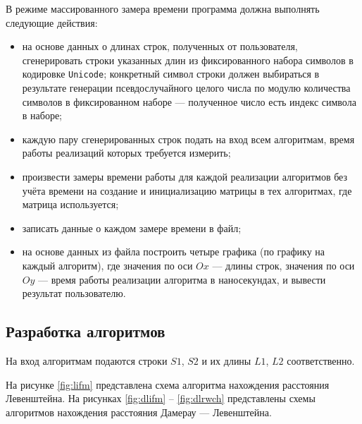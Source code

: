 В режиме массированного замера времени программа должна выполнять следующие действия:
\begin{itemize}
    \item на основе данных о длинах строк, полученных от пользователя, сгенерировать строки указанных длин из фиксированного набора символов в кодировке \texttt{Unicode}; конкретный символ строки должен выбираться в результате генерации псевдослучайного целого числа по модулю количества символов в фиксированном наборе --- полученное число есть индекс символа в наборе;
    \item каждую пару сгенерированных строк подать на вход всем алгоритмам, время работы реализаций которых требуется измерить;
    \item произвести замеры времени работы для каждой реализации алгоритмов без учёта времени на создание и инициализацию матрицы в тех алгоритмах, где матрица используется;
    \item записать данные о каждом замере времени в файл;
    \item на основе данных из файла построить четыре графика (по графику на каждый алгоритм), где значения по оси $Ox$ --- длины строк, значения по оси $Oy$ --- время работы реализации алгоритма в наносекундах, и вывести результат пользователю.
\end{itemize}

\newpage

\subsection{Разработка алгоритмов}

На вход алгоритмам подаются строки $S1$, $S2$ и их длины $L1$, $L2$ соответственно.

На рисунке \ref{fig:lifm} представлена схема алгоритма нахождения расстояния Левенштейна.
На рисунках \ref{fig:dlifm} -- \ref{fig:dlrwch} представлены схемы алгоритмов нахождения расстояния Дамерау --- Левенштейна.

